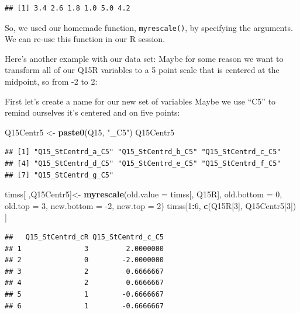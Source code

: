 \documentclass[
]{article}
\newenvironment{Shaded}{\begin{snugshade}}{\end{snugshade}}
\newcommand{\DataTypeTok}[1]{\textcolor[rgb]{0.13,0.29,0.53}{#1}}
\newcommand{\DecValTok}[1]{\textcolor[rgb]{0.00,0.00,0.81}{#1}}
\newcommand{\KeywordTok}[1]{\textcolor[rgb]{0.13,0.29,0.53}{\textbf{#1}}}
\newcommand{\NormalTok}[1]{#1}
\newcommand{\OperatorTok}[1]{\textcolor[rgb]{0.81,0.36,0.00}{\textbf{#1}}}
\newcommand{\StringTok}[1]{\textcolor[rgb]{0.31,0.60,0.02}{#1}}
\begin{document}
\begin{verbatim}
## [1] 3.4 2.6 1.8 1.0 5.0 4.2
\end{verbatim}

So, we used our homemade function, \texttt{myrescale()}, by specifying the arguments. We can re-use this function in our R session.

Here's another example with our data set:
Maybe for some reason we want to transform all of our Q15R variables to a 5 point scale that is centered at the midpoint, so from -2 to 2:

First let's create a name for our new set of variables Maybe we use ``C5'' to remind ourselves it's centered and on five points:

\begin{Shaded}
\begin{Highlighting}[]
\NormalTok{Q15Centr5 <-}\StringTok{ }\KeywordTok{paste0}\NormalTok{(Q15, }\StringTok{"_C5"}\NormalTok{)}
\NormalTok{Q15Centr5}
\end{Highlighting}
\end{Shaded}

\begin{verbatim}
## [1] "Q15_StCentrd_a_C5" "Q15_StCentrd_b_C5" "Q15_StCentrd_c_C5"
## [4] "Q15_StCentrd_d_C5" "Q15_StCentrd_e_C5" "Q15_StCentrd_f_C5"
## [7] "Q15_StCentrd_g_C5"
\end{verbatim}

\begin{Shaded}
\begin{Highlighting}[]
\NormalTok{timss[ ,Q15Centr5]<-}\StringTok{ }\KeywordTok{myrescale}\NormalTok{(}\DataTypeTok{old.value  =}\NormalTok{ timss[, Q15R], }
                      \DataTypeTok{old.bottom =}  \DecValTok{0}\NormalTok{, }
                      \DataTypeTok{old.top    =}  \DecValTok{3}\NormalTok{, }
                      \DataTypeTok{new.bottom =} \DecValTok{-2}\NormalTok{, }
                      \DataTypeTok{new.top    =}  \DecValTok{2}\NormalTok{)}
\NormalTok{timss[}\DecValTok{1}\OperatorTok{:}\DecValTok{6}\NormalTok{, }\KeywordTok{c}\NormalTok{(Q15R[}\DecValTok{3}\NormalTok{], Q15Centr5[}\DecValTok{3}\NormalTok{]) ]}
\end{Highlighting}
\end{Shaded}

\begin{verbatim}
##   Q15_StCentrd_cR Q15_StCentrd_c_C5
## 1               3         2.0000000
## 2               0        -2.0000000
## 3               2         0.6666667
## 4               2         0.6666667
## 5               1        -0.6666667
## 6               1        -0.6666667
\end{verbatim}
\end{document}
